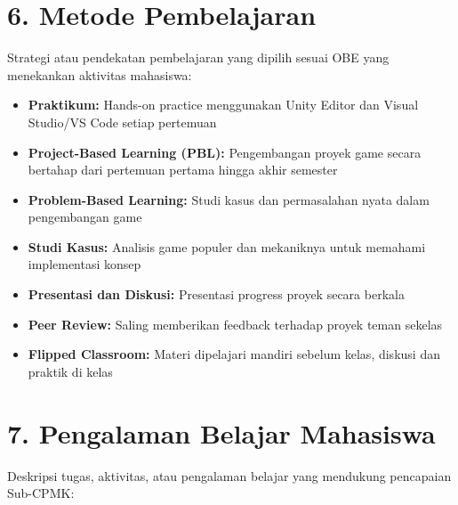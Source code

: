 \documentclass[12pt,a4paper]{article}
\begin{document}
\vspace{0.5cm}

\section*{6. Metode Pembelajaran}

Strategi atau pendekatan pembelajaran yang dipilih sesuai OBE yang menekankan aktivitas mahasiswa:

\begin{itemize}[leftmargin=*]
  \item \textbf{Praktikum:} Hands-on practice menggunakan Unity Editor dan Visual Studio/VS Code setiap pertemuan
  \item \textbf{Project-Based Learning (PBL):} Pengembangan proyek game secara bertahap dari pertemuan pertama hingga akhir semester
  \item \textbf{Problem-Based Learning:} Studi kasus dan permasalahan nyata dalam pengembangan game
  \item \textbf{Studi Kasus:} Analisis game populer dan mekaniknya untuk memahami implementasi konsep
  \item \textbf{Presentasi dan Diskusi:} Presentasi progress proyek secara berkala
  \item \textbf{Peer Review:} Saling memberikan feedback terhadap proyek teman sekelas
  \item \textbf{Flipped Classroom:} Materi dipelajari mandiri sebelum kelas, diskusi dan praktik di kelas
\end{itemize}

\vspace{0.5cm}

\section*{7. Pengalaman Belajar Mahasiswa}

Deskripsi tugas, aktivitas, atau pengalaman belajar yang mendukung pencapaian Sub-CPMK:
\end{document}
